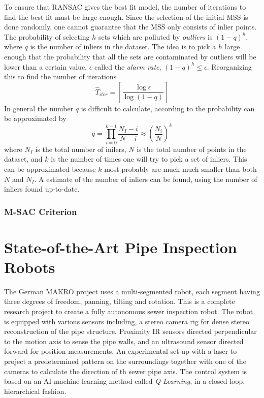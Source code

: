 To ensure that RANSAC gives the best fit model, the number of iterations to find the best
fit must be large enough. Since the selection of the initial MSS is done randomly, one
cannot guarantee that the MSS only consists of inlier points. The probability of
selecting $h$ sets which are polluted by \emph{outliers} is $(1 - q)^h$, where $q$ is the
number of inliers in the dataset. The idea is to pick a $h$ large enough that the
probability that all the sets are contaminated by outliers will be lower than a certain
value, $\epsilon$ called the \emph{alarm rate}, $(1 - q)^h \leq \epsilon$. Reorganizing
this to find the number of iterations
\begin{equation}
    \hat{T}_{iter} = \left \lceil \frac{\log \epsilon}{\log (1 - q)} \right\rceil
\end{equation}
In general the number $q$ is difficult to calculate, according to \cite{ransac-dummies}
the probability can be approximated by 
\begin{equation}
    q = \prod_{i = 0}^{k-1} \frac{N_I - i}{N - i} \approx \left ( \frac{N_i}{N} \right)^k
\end{equation}
where $N_I$ is the total number of inilers, $N$ is the total number of points in the
dataset, and $k$ is the number of times one will try to pick a set of inliers. This can be
approximated because $k$ most probably are much much smaller than both $N$ and $N_I$. A
estimate of the number of inliers can be found, using the number of inliers found
up-to-date. \cite{ransac-dummies}


\subsubsection{M-SAC Criterion}



\section{State-of-the-Art Pipe Inspection Robots}
The German MAKRO project \cite{MAKRO-project} uses a multi-segmented robot, each segment 
having three degrees of freedom, panning, tilting and rotation. This is a complete
research project to create a fully autonomous sewer inspection robot. The robot is
equipped with various sensors including, a stereo camera rig for dense stereo
reconstruction of the pipe structure. Proximity IR sensors directed perpendicular to the
motion axis to sense the pipe walls, and an ultrasound sensor directed forward for
position measurements. An experimental set-up with a laser to project a predetermined
pattern on the surroundings together with one of the cameras to calculate the direction of
th sewer pipe axis. The control system is based on an AI machine learning method called \emph{Q-Learning}, in
a closed-loop, hierarchical fashion.


